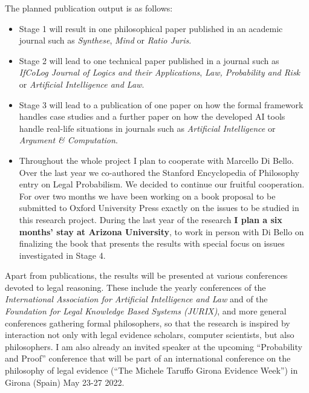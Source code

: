 \documentclass[11pt,dvipsnames,enabledeprecatedfontcommands]{scrartcl}
\begin{document}
\vspace{2mm}

The planned publication output is as follows:

\begin{itemize}\setlength\itemsep{1mm}
\item \textsf{Stage 1} will result in  one philosophical paper published in an  academic journal such as \emph{Synthese}, \emph{Mind} or \emph{Ratio Juris}. 

\item \textsf{Stage 2} will lead to one   technical paper  published in a journal such as \emph{IfCoLog Journal of Logics and their Applications}, \emph{Law, Probability and Risk} or \emph{Artificial Intelligence and Law}.

\item \textsf{Stage 3}  will lead to a publication of one paper  on  how the formal framework handles case studies and  a further paper  on how the developed AI tools handle real-life situations in   journals such as \emph{Artificial Intelligence} or \emph{Argument \& Computation}.

\item Throughout the  whole project I plan to cooperate with Marcello Di Bello. Over the last year we co-authored the Stanford Encyclopedia of Philosophy entry on Legal Probabilism. We decided to continue our fruitful cooperation. For over two months we have been working on a book proposal to be submitted to Oxford University Press exactly on the issues to be studied in this research project.  During the last year of the research \textbf{I plan a six months' stay at Arizona University}, to work in person with Di Bello on finalizing the book that presents the results with special focus on issues investigated in \textsf{Stage 4}.
\end{itemize}

Apart from publications, the results will be presented at various
conferences devoted to legal reasoning. These include the yearly
conferences of the
\emph{International Association for Artificial Intelligence and Law} and
of the \emph{Foundation for Legal Knowledge Based Systems (JURIX)}, and
more general conferences gathering formal philosophers, so that the
research is inspired by interaction not only with legal evidence
scholars, computer scientists, but also philosophers. I am also already
an invited speaker at the upcoming ``Probability and Proof'' conference
that will be part of an international conference on the philosophy of
legal evidence (``The Michele Taruffo Girona Evidence Week'') in Girona
(Spain) May 23-27 2022.
\end{document}
